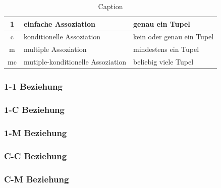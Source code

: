 \documentclass{article}
\begin{document}
\begin{table}[h!]
  \centering
  \begin{tabular}{ |c|l|l| }
    \hline
    1  & einfache Assoziation              & genau ein Tupel           \\
    \hline
    c  & konditionelle Assoziation         & kein oder genau ein Tupel \\
    \hline
    m  & multiple Assoziation              & mindestens ein Tupel      \\
    \hline
    mc & mutiple-konditionelle Assoziation & beliebig viele Tupel      \\
    \hline
  \end{tabular}
  \caption{Caption}
  \label{tab:my_label}
\end{table}

\subsubsection{1-1 Beziehung}
\subsubsection{1-C Beziehung}
\subsubsection{1-M Beziehung}
\subsubsection{C-C Beziehung}
\subsubsection{C-M Beziehung}
\end{document}
